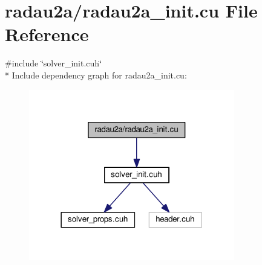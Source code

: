 \hypertarget{radau2a__init_8cu}{}\section{radau2a/radau2a\+\_\+init.cu File Reference}
\label{radau2a__init_8cu}
{\ttfamily \#include \char`\"{}solver\+\_\+init.\+cuh\char`\"{}}\\*
Include dependency graph for radau2a\+\_\+init.\+cu\+:\nopagebreak
\begin{figure}[H]
\begin{center}
\leavevmode
\includegraphics[width=254pt]{radau2a__init_8cu__incl}
\end{center}
\end{figure}
